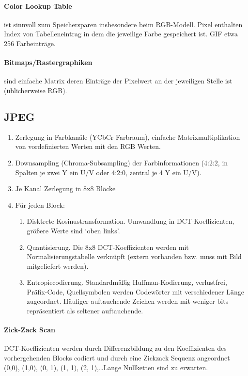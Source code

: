 \documentclass[twocolumn]{article}
\begin{document}
\paragraph{Color Lookup Table} ist sinnvoll zum Speichersparen insbesondere beim RGB-Modell. Pixel enthalten Index von Tabelleneintrag in dem die jeweilige Farbe gespeichert ist. GIF etwa 256 Farbeinträge.

\paragraph{Bitmaps/Rastergraphiken} sind einfache Matrix deren Einträge der Pixelwert an der jeweiligen Stelle ist (üblicherweise RGB).

\subsection{JPEG}

\begin{enumerate}
    \item Zerlegung in Farbkanäle (YCbCr-Farbraum), einfache Matrixmultiplikation von vordefinierten Werten mit den RGB Werten.
    \item Downsampling (Chroma-Subsampling) der Farbinformationen (4:2:2, in Spalten je zwei Y ein U/V oder 4:2:0, zentral je 4 Y ein U/V).
    \item Je Kanal Zerlegung in 8x8 Blöcke
    \item Für jeden Block:
    \begin{enumerate}
        \item Disktrete Kosinustransformation. Umwandlung in DCT-Koeffizienten, größere Werte sind \enquote*{oben links}.
        \item Quantisierung. Die 8x8 DCT-Koeffizienten werden mit Normalisierungstabelle verknüpft (extern vorhanden bzw. muss mit Bild mitgeliefert werden).
        \item Entropiecodierung. Standardmäßig Huffman-Kodierung, verlustfrei, Präfix-Code, Quellsymbolen werden Codewörter mit verschiedener Länge zugeordnet. Häufiger auftauchende Zeichen werden mit weniger bits repräsentiert als seltener auftauchende.
    \end{enumerate}
\end{enumerate}

\paragraph{Zick-Zack Scan} DCT-Koeffizienten werden durch Differenzbildung zu den Koeffizienten des vorhergehenden Blocks codiert und durch eine Zickzack Sequenz angeordnet (0,0), (1,0), (0, 1), (1, 1), (2, 1),\ldots Lange Nullketten sind zu erwarten.
\end{document}
